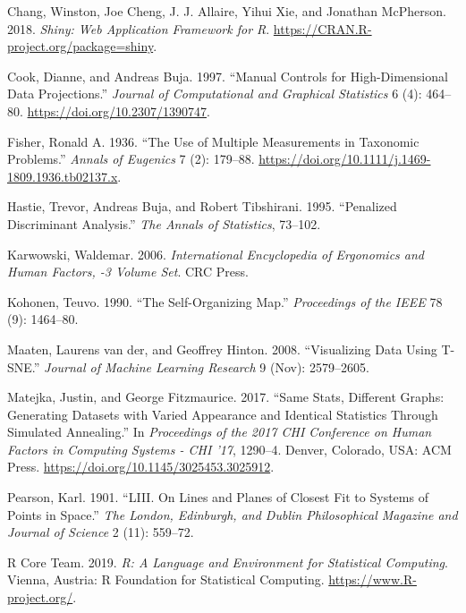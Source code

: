 \documentclass[
]{article}
\begin{document}
\leavevmode\hypertarget{ref-chang_shiny:_2018}{}%
Chang, Winston, Joe Cheng, J. J. Allaire, Yihui Xie, and Jonathan
McPherson. 2018. \emph{Shiny: Web Application Framework for R}.
\url{https://CRAN.R-project.org/package=shiny}.

\leavevmode\hypertarget{ref-cook_manual_1997}{}%
Cook, Dianne, and Andreas Buja. 1997. ``Manual Controls for
High-Dimensional Data Projections.'' \emph{Journal of Computational and
Graphical Statistics} 6 (4): 464--80.
\url{https://doi.org/10.2307/1390747}.

\leavevmode\hypertarget{ref-fisher_use_1936}{}%
Fisher, Ronald A. 1936. ``The Use of Multiple Measurements in Taxonomic
Problems.'' \emph{Annals of Eugenics} 7 (2): 179--88.
\url{https://doi.org/10.1111/j.1469-1809.1936.tb02137.x}.

\leavevmode\hypertarget{ref-hastie_penalized_1995}{}%
Hastie, Trevor, Andreas Buja, and Robert Tibshirani. 1995. ``Penalized
Discriminant Analysis.'' \emph{The Annals of Statistics}, 73--102.

\leavevmode\hypertarget{ref-karwowski_international_2006}{}%
Karwowski, Waldemar. 2006. \emph{International Encyclopedia of
Ergonomics and Human Factors, -3 Volume Set}. CRC Press.

\leavevmode\hypertarget{ref-kohonen_self-organizing_1990}{}%
Kohonen, Teuvo. 1990. ``The Self-Organizing Map.'' \emph{Proceedings of
the IEEE} 78 (9): 1464--80.

\leavevmode\hypertarget{ref-maaten_visualizing_2008}{}%
Maaten, Laurens van der, and Geoffrey Hinton. 2008. ``Visualizing Data
Using T-SNE.'' \emph{Journal of Machine Learning Research} 9 (Nov):
2579--2605.

\leavevmode\hypertarget{ref-matejka_same_2017}{}%
Matejka, Justin, and George Fitzmaurice. 2017. ``Same Stats, Different
Graphs: Generating Datasets with Varied Appearance and Identical
Statistics Through Simulated Annealing.'' In \emph{Proceedings of the
2017 CHI Conference on Human Factors in Computing Systems - CHI '17},
1290--4. Denver, Colorado, USA: ACM Press.
\url{https://doi.org/10.1145/3025453.3025912}.

\leavevmode\hypertarget{ref-pearson_liii._1901}{}%
Pearson, Karl. 1901. ``LIII. On Lines and Planes of Closest Fit to
Systems of Points in Space.'' \emph{The London, Edinburgh, and Dublin
Philosophical Magazine and Journal of Science} 2 (11): 559--72.

\leavevmode\hypertarget{ref-r_core_team_r:_2019}{}%
R Core Team. 2019. \emph{R: A Language and Environment for Statistical
Computing}. Vienna, Austria: R Foundation for Statistical Computing.
\url{https://www.R-project.org/}.
\end{document}
